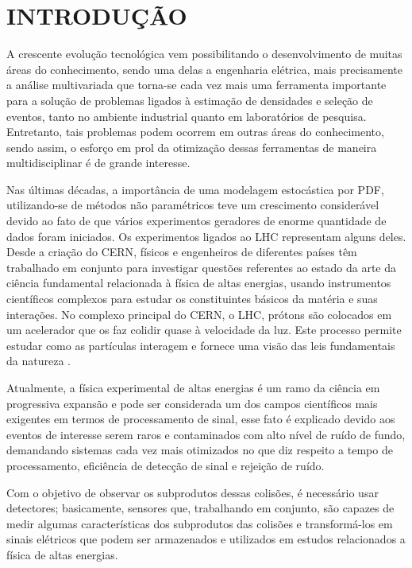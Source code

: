 \chapter{INTRODUÇÃO} \label{cap:intro}
\vspace{-2cm}
A crescente evolução tecnológica vem possibilitando o desenvolvimento de muitas áreas do conhecimento, sendo uma delas a engenharia elétrica, mais precisamente a análise multivariada \cite{vicini2005analise} que torna-se cada vez mais uma ferramenta importante para a solução de problemas ligados à estimação de densidades e seleção de eventos, tanto no ambiente industrial quanto em laboratórios de pesquisa. Entretanto, tais problemas podem ocorrem em outras áreas do conhecimento, sendo assim, o esforço em prol da otimização dessas ferramentas de maneira multidisciplinar é de grande interesse.

Nas últimas décadas, a importância de uma modelagem estocástica por \ac{PDF}, utilizando-se de métodos não paramétricos teve um crescimento considerável devido ao fato de que vários experimentos geradores de enorme quantidade de dados foram iniciados.  Os experimentos ligados ao \ac{LHC} representam alguns deles. Desde a criação do \ac{CERN}, físicos e engenheiros de diferentes países têm trabalhado em conjunto para investigar questões referentes ao estado da arte da ciência fundamental relacionada à física de altas energias, usando instrumentos científicos complexos para estudar os constituintes básicos da matéria e suas interações. No complexo principal do \ac{CERN}, o \ac{LHC}, prótons são colocados em um acelerador que os faz colidir quase à velocidade da luz. Este processo permite estudar como as partículas interagem e fornece uma visão das leis fundamentais da natureza \cite{cernwebabout}.


Atualmente, a física experimental de altas energias é um ramo da ciência em progressiva expansão e pode ser considerada um dos campos científicos mais exigentes em termos de processamento de sinal, esse fato é explicado devido aos eventos de interesse serem raros e contaminados com alto nível de ruído de fundo, demandando sistemas cada vez mais otimizados no que diz respeito a tempo de processamento, eficiência de detecção de sinal e rejeição de ruído.

Com o objetivo de observar os subprodutos dessas colisões, é necessário usar detectores; basicamente, sensores que, trabalhando em conjunto, são capazes de medir algumas características dos subprodutos das colisões e transformá-los em sinais elétricos que podem ser armazenados e utilizados em estudos relacionados a física de altas energias.

